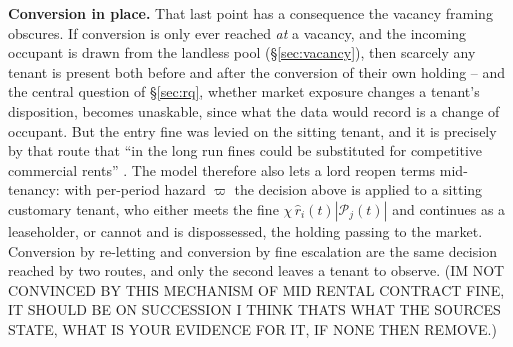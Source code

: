 \documentclass[11pt,english]{article}
\begin{document}
\textbf{Conversion in place.} That last point has a consequence the vacancy framing obscures. If conversion is only ever reached \emph{at} a vacancy, and the incoming occupant is drawn from the landless pool (\S\ref{sec:vacancy}), then scarcely any tenant is present both before and after the conversion of their own holding -- and the central question of \S\ref{sec:rq}, whether market exposure changes a tenant's disposition, becomes unaskable, since what the data would record is a change of occupant. But the entry fine was levied on the sitting tenant, and it is precisely by that route that ``in the long run fines could be substituted for competitive commercial rents'' \cite[p.62]{brenner1976agrarian}. The model therefore also lets a lord reopen terms mid-tenancy: with per-period hazard $\varpi$ the decision above is applied to a sitting customary tenant, who either meets the fine $\chi\,\hat r_i(t)|\mathcal{P}_j(t)|$ and continues as a leaseholder, or cannot and is dispossessed, the holding passing to the market. Conversion by re-letting and conversion by fine escalation are the same decision reached by two routes, and only the second leaves a tenant to observe. (IM NOT CONVINCED BY THIS MECHANISM OF MID RENTAL CONTRACT FINE, IT SHOULD BE ON SUCCESSION I THINK THATS WHAT THE SOURCES STATE, WHAT IS YOUR EVIDENCE FOR IT, IF NONE THEN REMOVE.)
\end{document}
